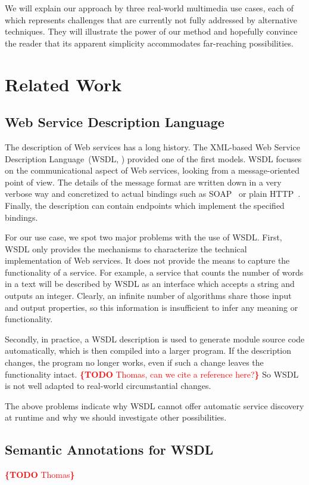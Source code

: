 \documentclass[runningheads,a4paper, twocolumn]{llncs}
\newcommand{\todo}[1]{\noindent\textcolor{red}{{\bf \{TODO} #1{\bf \}}}}
\begin{document}
We will explain our approach by three real-world multimedia use cases, each of which represents challenges that are currently not fully addressed by alternative techniques. They will illustrate the power of our method and hopefully convince the reader that its apparent simplicity accommodates far-reaching possibilities.


\section{Related Work}
\subsection{Web Service Description Language}
The description of Web services has a long history. The XML-based Web Service Description Language~(WSDL, \cite{WSDL1, WSDL2}) provided one of the first models. WSDL focuses on the communicational aspect of Web services, looking from a message-oriented point of view. The details of the message format are written down in a very verbose way and concretized to actual bindings such as SOAP~\cite{SOAP} or plain HTTP~\cite{HTTP}. Finally, the description can contain endpoints which implement the specified bindings.

For our use case, we spot two major problems with the use of WSDL. First, WSDL only provides the mechanisms to characterize the technical implementation of Web services. It does not provide the means to capture the functionality of a service. For example, a service that counts the number of words in a text will be described by WSDL as an interface which accepts a string and outputs an integer. Clearly, an infinite number of algorithms share those input and output properties, so this information is insufficient to infer any meaning or functionality.

Secondly, in practice, a WSDL description is used to generate module source code automatically, which is then compiled into a larger program. If the description changes, the program no longer works, even if such a change leaves the functionality intact. \todo{Thomas, can we cite a reference here?} So WSDL is not well adapted to real-world circumstantial changes.

The above problems indicate why WSDL cannot offer automatic service discovery at runtime and why we should investigate other possibilities.

\subsection{Semantic Annotations for WSDL}
\todo{Thomas}
\end{document}
